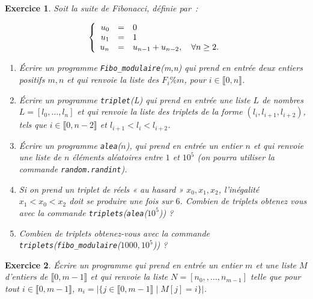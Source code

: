 \documentclass[11pt,a4paper]{article}
\newtheorem{ex}{Exercice}
\begin{document}
\begin{ex}

Soit la suite de Fibonacci, définie par~:

\begin{displaymath}
  \left\{
    \begin{array}[l]{rcl}
      u_0 &=& 0\\
      u_1 &=& 1\\
      u_{n} &=& u_{n-1} + u_{n-2},  \quad \forall n\geq 2.
    \end{array}\right.
\end{displaymath}

\begin{enumerate}



\item Écrire un programme \texttt{Fibo\_modulaire}(m,n) qui prend en entrée deux entiers positifs $m,n$ et qui renvoie la liste des $F_i\%m$, pour $i\in \llbracket 0,n\rrbracket$. 

\item Écrire un programme \texttt{triplet}(L) qui prend en entrée une liste $L$ de nombres $L=[l_0,\ldots,l_n]$ et qui renvoie la liste des triplets de la forme $(l_i,l_{i+1},l_{i+2})$,  tels que $i\in \llbracket 0,n-2\rrbracket$ et $l_{i+1}<l_{i}<l_{i+2}$.

\item Écrire un programme \texttt{alea}($n$), qui prend en entrée un entier $n$ et qui renvoie une liste de $n$ éléments aléatoires entre $1$ et $10^5$ (on pourra utiliser la commande \texttt{random.randint}).

\item Si on prend un triplet de réels « au hasard » $x_0,x_1,x_2$, l'inégalité $x_1<x_0<x_2$ doit se produire une fois sur $6$. Combien de triplets obtenez vous avec la commande \texttt{triplets}(\texttt{alea}($10^5$)) ?

\item Combien de triplets obtenez-vous avec la commande  \texttt{triplets}(\texttt{fibo\_modulaire}($1000,10^5$)) ?
\end{enumerate}
\end{ex}


\begin{ex}
 Écrire un programme qui prend en entrée  un entier $m$ et une liste   $M$ d'entiers de $\llbracket 0,m-1\rrbracket$ et  qui renvoie la liste $N=[n_0,,\ldots,n_{m-1}]$ telle que pour tout $i\in \llbracket 0,m-1\rrbracket$, $n_i=|\{j\in \llbracket 0,m-1\rrbracket \mid M[j]=i\}|$. 

\end{ex}
\end{document}
